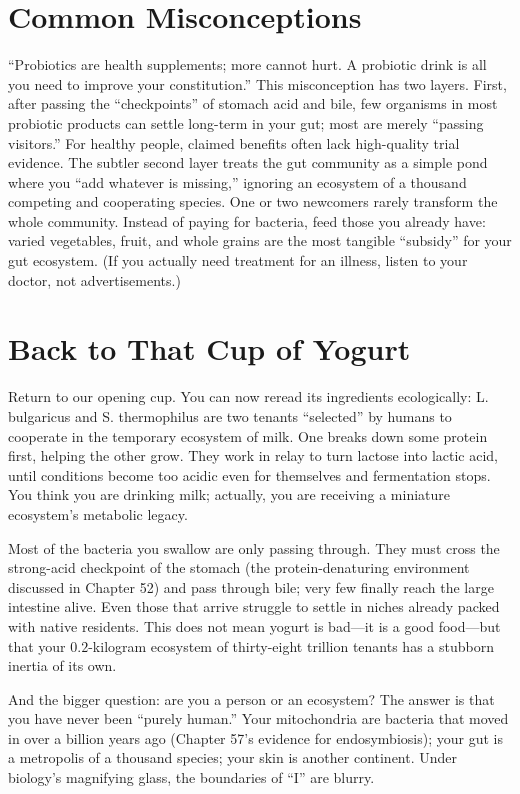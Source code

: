 \section*{Common Misconceptions}

\begin{wuqu}
``Probiotics are health supplements; more cannot hurt. A probiotic drink is all you need to improve your constitution.'' This misconception has two layers. First, after passing the ``checkpoints'' of stomach acid and bile, few organisms in most probiotic products can settle long-term in your gut; most are merely ``passing visitors.'' For healthy people, claimed benefits often lack high-quality trial evidence. The subtler second layer treats the gut community as a simple pond where you ``add whatever is missing,'' ignoring an ecosystem of a thousand competing and cooperating species. One or two newcomers rarely transform the whole community. Instead of paying for bacteria, feed those you already have: varied vegetables, fruit, and whole grains are the most tangible ``subsidy'' for your gut ecosystem. (If you actually need treatment for an illness, listen to your doctor, not advertisements.)
\end{wuqu}

\section{Back to That Cup of Yogurt}

Return to our opening cup. You can now reread its ingredients ecologically: L. bulgaricus and S. thermophilus are two tenants ``selected'' by humans to cooperate in the temporary ecosystem of milk. One breaks down some protein first, helping the other grow. They work in relay to turn lactose into lactic acid, until conditions become too acidic even for themselves and fermentation stops. You think you are drinking milk; actually, you are receiving a miniature ecosystem's metabolic legacy.

Most of the bacteria you swallow are only passing through. They must cross the strong-acid checkpoint of the stomach (the protein-denaturing environment discussed in Chapter 52) and pass through bile; very few finally reach the large intestine alive. Even those that arrive struggle to settle in niches already packed with native residents. This does not mean yogurt is bad---it is a good food---but that your $0.2$-kilogram ecosystem of thirty-eight trillion tenants has a stubborn inertia of its own.

And the bigger question: are you a person or an ecosystem? The answer is that you have never been ``purely human.'' Your mitochondria are bacteria that moved in over a billion years ago (Chapter 57's evidence for endosymbiosis); your gut is a metropolis of a thousand species; your skin is another continent. Under biology's magnifying glass, the boundaries of ``I'' are blurry.

